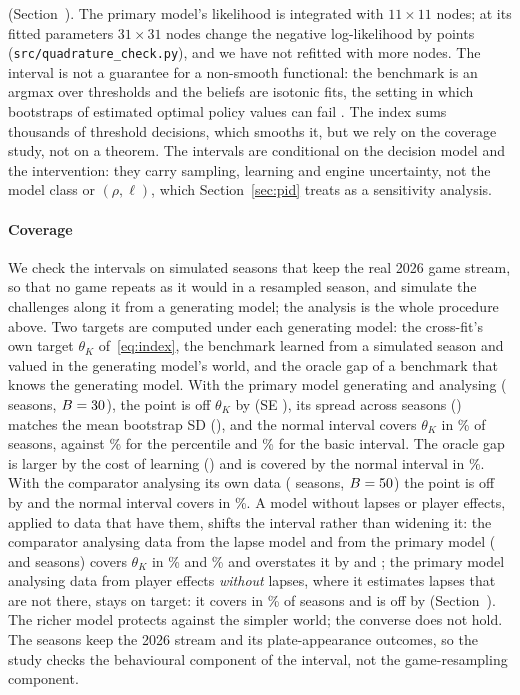\documentclass[aoas]{imsart}
\theoremstyle{plain}
\theoremstyle{definition}
\begin{document}
(Section~). The primary model's likelihood is integrated with $11\times11$ nodes; at its fitted parameters $31\times31$ nodes change the negative log-likelihood by \QuadDiff{} points
(\nolinkurl{src/quadrature_check.py}), and we have not refitted with more nodes. The interval is not a guarantee for a non-smooth functional: the benchmark is an
argmax over thresholds and the beliefs are isotonic fits, the setting in which bootstraps of estimated optimal policy
values can fail \citep{ChakrabortyEtAl2013,LuedtkeVanDerLaan2016}. The index sums thousands of threshold decisions,
which smooths it, but we rely on the coverage study, not on a theorem. The intervals are conditional on the
decision model and the intervention: they carry sampling, learning and engine uncertainty, not the model class or
$(\rho,\ell)$, which Section~\ref{sec:pid} treats as a sensitivity analysis.

\paragraph{Coverage} We check the intervals on simulated seasons that keep the real 2026 game stream, so that no game
repeats as it would in a resampled season, and simulate the challenges along it from a generating model; the analysis
is the whole procedure above. Two targets are computed under each generating model: the cross-fit's own target
$\theta_K$ of~\eqref{eq:index}, the benchmark learned from a simulated season and valued in the generating model's world,
and the oracle gap of a benchmark that knows the generating model. With the primary model generating and analysing
(\CPPrimS{} seasons, $B=30$), the point is off $\theta_K$ by \CPPrimBiasK{} (SE \CPPrimBiasSE), its spread across
seasons (\CPPrimPointSD) matches the mean bootstrap SD (\CPPrimBootSD), and the normal interval covers $\theta_K$ in
\CPPrimKNormal\% of seasons, against \CPPrimKPct\% for the percentile and \CPPrimKBasic\% for the basic interval. The
oracle gap is larger by the cost of learning (\CPPrimLearn) and is covered by the normal interval in \CPPrimNormal\%. With
the comparator analysing its own data (\CPMainS{} seasons, $B=50$) the point is off by \CPMainBiasK{} and the normal
interval covers in \CPMainKNormal\%. A model without lapses or player effects, applied to data that have them, shifts
the interval rather than widening it: the comparator analysing data from the lapse model and from the primary model (\CPLapseS{} and \CPRES{} seasons) covers $\theta_K$ in
\CPLapseKNormal\% and \CPREKNormal\% and overstates it by \CPLapseBiasK{} and \CPREBiasK; the primary model analysing data from player effects \emph{without} lapses, where it estimates lapses that are not
there, stays on target: it covers in \CPMisKNormal\% of \CPMisS{} seasons and is off by \CPMisBiasK{}
(Section~). The richer model protects against the simpler world; the converse does not hold. The seasons keep the 2026 stream and its
plate-appearance outcomes, so the study checks the behavioural component of the interval, not the game-resampling
component.
\end{document}
